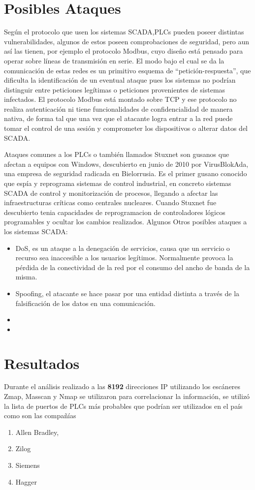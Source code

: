 \documentclass[jou,apacite]{apa6}   %
\begin{document}
\section{Posibles Ataques}
Según el protocolo que usen los sistemas SCADA,PLCs pueden poseer distintas vulnerabilidades, algunos de estos poseen comprobaciones de seguridad, pero aun así las tienen, por ejemplo el protocolo Modbus, cuyo diseño está pensado para operar sobre líneas de transmisión en serie. El modo bajo el cual se da la comunicación de estas redes es un primitivo esquema de “petición-respuesta”, que dificulta la identificación de un eventual ataque pues los sistemas no podrían distinguir entre peticiones legítimas o peticiones provenientes de sistemas infectados. El protocolo Modbus está montado sobre TCP y ese protocolo no realiza autenticación ni tiene funcionalidades de confidencialidad de manera nativa, de forma tal que una vez que el atacante logra entrar a la red puede tomar el control de una sesión y comprometer los dispositivos o alterar datos del SCADA.

Ataques comunes a los PLCs o también llamados Stuxnet son gusanos que afectan a equipos con Windows, descubierto en junio de 2010 por VirusBlokAda, una empresa de seguridad radicada en Bielorrusia. Es el primer gusano conocido que espía y reprograma sistemas de control industrial, en concreto sistemas SCADA de control y monitorización de procesos, llegando a afectar las infraestructuras críticas como centrales nucleares.
Cuando Stuxnet fue descubierto tenia capacidades de reprogramacion de controladores lógicos programables y ocultar los cambios realizados. 
Algunos Otros posibles ataques a los sistemas SCADA:
\begin{itemize}
\item DoS, es un ataque a la denegación de servicios, causa que un servicio o recurso sea inaccesible a los usuarios legítimos. Normalmente provoca la pérdida de la conectividad de la red por el consumo del ancho de banda de la misma.
\item Spoofing, el atacante se hace pasar por una entidad distinta a través de la falsificación de los datos en una comunicación.
\item 
\item 
\end{itemize}

\section{Resultados }
Durante el análisis realizado a las \textbf{8192} direcciones IP utilizando los escáneres Zmap, Masscan y Nmap se utilizaron para  correlacionar la información, se utilizó la lista de puertos de PLCs más probables que podrían ser utilizados en el país como son las compañías
\begin{enumerate}
\item Allen Bradley,
\item Zilog
\item Siemens
\item Hagger
\end{enumerate}
\end{document}

